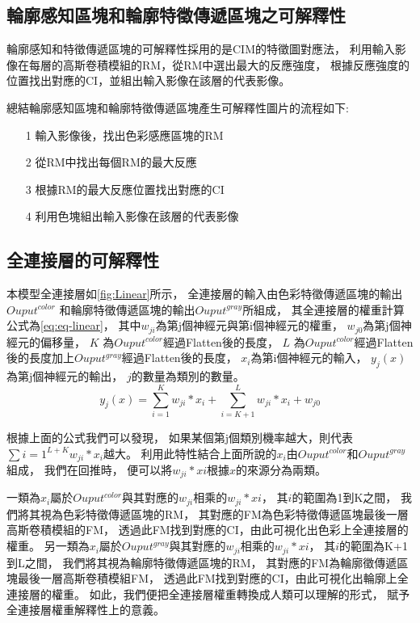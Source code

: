 \documentclass[class=NCU_thesis, crop=false]{standalone}
\begin{document}
	\subsection{輪廓感知區塊和輪廓特徵傳遞區塊之可解釋性}
	輪廓感知和特徵傳遞區塊的可解釋性採用的是CIM的特徵圖對應法，
	利用輸入影像在每層的高斯卷積模組的RM，從RM中選出最大的反應強度，
	根據反應強度的位置找出對應的CI，並組出輸入影像在該層的代表影像。

	總結輪廓感知區塊和輪廓特徵傳遞區塊產生可解釋性圖片的流程如下:
	\begin{itemize}
		\item [1]
		輸入影像後，找出色彩感應區塊的RM
		\item [2]
		從RM中找出每個RM的最大反應
		\item [3]
		根據RM的最大反應位置找出對應的CI
		\item [4]
		利用色塊組出輸入影像在該層的代表影像
	\end{itemize}

\subsection{全連接層的可解釋性}
本模型全連接層如\cref{fig:Linear}所示，
全連接層的輸入由色彩特徵傳遞區塊的輸出$Ouput^{color}$
和輪廓特徵傳遞區塊的輸出$Ouput^{gray}$所組成，
其全連接層的權重計算公式為\cref{eq:eq-linear}，
其中$w_{ji}$為第j個神經元與第i個神經元的權重，
$w_{j0}$為第j個神經元的偏移量，
$K$ 為$Ouput^{color}$經過Flatten後的長度，
$L$ 為$Ouput^{color}$經過Flatten後的長度加上$Ouput^{gray}$經過Flatten後的長度，
$x_{i}$為第i個神經元的輸入，
$y_{j}(x)$為第j個神經元的輸出，
$j$的數量為類別的數量。
\begin{equation}
    \label{eq:eq-linear}
    y_{j}(x) = \sum_{i=1}^{K}w_{ji} * x_{i} + \sum_{i=K+1}^{L}w_{ji} * x_{i} + w_{j0}
\end{equation}

根據上面的公式我們可以發現，
如果某個第j個類別機率越大，則代表$\sum{i=1}^{L+K}w_{ji} * x_{i}$越大。
利用此特性結合上面所說的$x_{i}$由$Ouput^{color}$和$Ouput^{gray}$組成，
我們在回推時，
便可以將$w_{ji} * x{i}$根據$x$的來源分為兩類。

一類為$x_{i}$屬於$Ouput^{color}$與其對應的$w_{ji}$相乘的$w_{ji} * x{i}$，
其$i$的範圍為1到K之間，
我們將其視為色彩特徵傳遞區塊的RM，
其對應的FM為色彩特徵傳遞區塊最後一層高斯卷積模組的FM，
透過此FM找到對應的CI，由此可視化出色彩上全連接層的權重。
另一類為$x_{i}$屬於$Ouput^{gray}$與其對應的$w_{ji}$相乘的$w_{ji} * x{i}$，
其$i$的範圍為K+1到L之間，
我們將其視為輪廓特徵傳遞區塊的RM，
其對應的FM為輪廓徵傳遞區塊最後一層高斯卷積模組FM，
透過此FM找到對應的CI，由此可視化出輪廓上全連接層的權重。
如此，我們便把全連接層權重轉換成人類可以理解的形式，
賦予全連接層權重解釋性上的意義。
\end{document}
